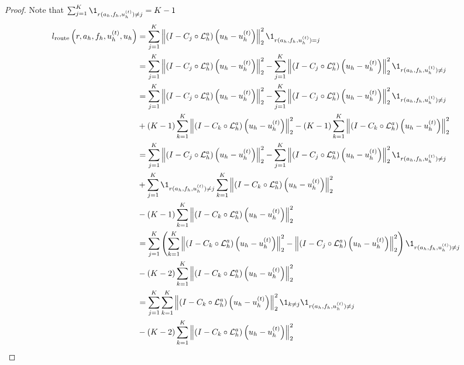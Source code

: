 \documentclass{article} %
\begin{document}
\begin{proof}
Note that $\sum_{j = 1}^K \1_{r(a_h, f_h, u^{(t)}_h) \neq j}= K - 1$
\begin{align*}
    l_{\text{route}}\left(r, a_h, f_h, u^{(t)}_h, u_h\right) &= \sum_{j = 1}^K \left\|\left( I - C_{j} \circ \mathcal{L}_{h}^a\right)\left(u_h - u^{(t)}_h\right)\right\|^2_2\1_{r(a_h, f_h, u^{(t)}_h) = j} \\
    &= \sum_{j = 1}^K \left\|\left( I - C_{j} \circ \mathcal{L}_{h}^a\right)\left(u_h - u^{(t)}_h\right)\right\|^2_2 - \sum_{j = 1}^K \left\|\left( I - C_{j} \circ \mathcal{L}_{h}^a\right)\left(u_h - u^{(t)}_h\right)\right\|^2_2\1_{r(a_h, f_h, u^{(t)}_h) \neq j} \\
    &= \sum_{j = 1}^K \left\|\left( I - C_{j} \circ \mathcal{L}_{h}^a\right)\left(u_h - u^{(t)}_h\right)\right\|^2_2 - \sum_{j = 1}^K \left\|\left( I - C_{j} \circ \mathcal{L}_{h}^a\right)\left(u_h - u^{(t)}_h\right)\right\|^2_2\1_{r(a_h, f_h, u^{(t)}_h) \neq j} \\
    &+ \left(K - 1\right)\sum_{k = 1}^K\left\|\left( I - C_{k} \circ \mathcal{L}_{h}^a\right)\left(u_h - u^{(t)}_h\right)\right\|^2_2 - \left(K - 1\right)\sum_{k = 1}^K\left\|\left( I - C_{k} \circ \mathcal{L}_{h}^a\right)\left(u_h - u^{(t)}_h\right)\right\|^2_2 \\
    &= \sum_{j = 1}^K \left\|\left( I - C_{j} \circ \mathcal{L}_{h}^a\right)\left(u_h - u^{(t)}_h\right)\right\|^2_2 - \sum_{j = 1}^K \left\|\left( I - C_{j} \circ \mathcal{L}_{h}^a\right)\left(u_h - u^{(t)}_h\right)\right\|^2_2\1_{r(a_h, f_h, u^{(t)}_h) \neq j} \\
    &+ \sum_{j = 1}^K\1_{r(a_h, f_h, u^{(t)}_h) \neq j}\sum_{k = 1}^K\left\|\left( I - C_{k} \circ \mathcal{L}_{h}^a\right)\left(u_h - u^{(t)}_h\right)\right\|^2_2 \\
    &- \left(K - 1\right)\sum_{k = 1}^K\left\|\left( I - C_{k} \circ \mathcal{L}_{h}^a\right)\left(u_h - u^{(t)}_h\right)\right\|^2_2 \\
    &= \sum_{j = 1}^K\left(\sum_{k = 1}^K\left\|\left( I - C_{k} \circ \mathcal{L}_{h}^a\right)\left(u_h - u^{(t)}_h\right)\right\|^2_2  - \left\|\left( I - C_{j} \circ \mathcal{L}_{h}^a\right)\left(u_h - u^{(t)}_h\right)\right\|^2_2\right)\1_{r(a_h, f_h, u^{(t)}_h) \neq j} \\
    &- \left(K - 2\right)\sum_{k = 1}^K\left\|\left( I - C_{k} \circ \mathcal{L}_{h}^a\right)\left(u_h - u^{(t)}_h\right)\right\|^2_2 \\
    &=\sum_{j = 1}^K\sum_{k = 1}^K\left\|\left( I - C_{k} \circ \mathcal{L}_{h}^a\right)\left(u_h - u^{(t)}_h\right)\right\|^2_2\1_{k\neq j}\1_{r(a_h, f_h, u^{(t)}_h) \neq j} \\
    &- \left(K - 2\right)\sum_{k = 1}^K\left\|\left( I - C_{k} \circ \mathcal{L}_{h}^a\right)\left(u_h - u^{(t)}_h\right)\right\|^2_2
 \end{align*}
\end{proof}
\end{document}
